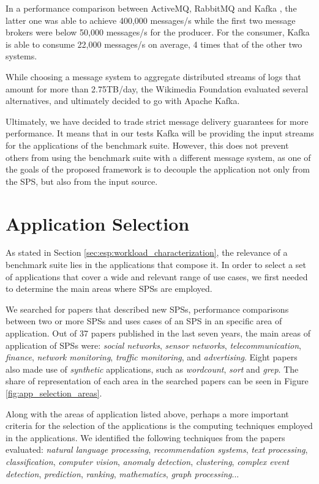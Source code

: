 \documentclass[ppgc,diss,english]{iiufrgs}
\begin{document}
In a performance comparison between ActiveMQ, RabbitMQ and Kafka \cite{kreps2011kafka}, the latter one was able to achieve 400,000 messages/s while the first two message brokers were below 50,000 messages/s for the producer. For the consumer, Kafka is able to consume 22,000 messages/s on average, 4 times that of the other two systems.

While choosing a message system to aggregate distributed streams of logs that amount for more than 2.75TB/day, the Wikimedia Foundation evaluated \cite{Wikimedia:2014} several alternatives, and ultimately decided to go with Apache Kafka.

Ultimately, we have decided to trade strict message delivery guarantees for more performance. It means that in our tests Kafka will be providing the input streams for the applications of the benchmark suite. However, this does not prevent others from using the benchmark suite with a different message system, as one of the goals of the proposed framework is to decouple the application not only from the SPS, but also from the input source.


\section{Application Selection}
\label{sec:application-selection}

As stated in Section \ref{sec:esp:workload_characterization}, the relevance of a benchmark suite lies in the applications that compose it. In order to select a set of applications that cover a wide and relevant range of use cases, we first needed to determine the main areas where SPSs are employed.

We searched for papers that described new SPSs, performance comparisons between two or more SPSs and uses cases of an SPS in an specific area of application. Out of 37 papers published in the last seven years, the main areas of application of SPSs were: \emph{social networks}, \emph{sensor networks}, \emph{telecommunication}, \emph{finance}, \emph{network monitoring}, \emph{traffic monitoring}, and \emph{advertising}. Eight papers also made use of \emph{synthetic} applications, such as \emph{wordcount}, \emph{sort} and \emph{grep}. The share of representation of each area in the searched papers can be seen in Figure \ref{fig:app_selection_areas}.

Along with the areas of application listed above, perhaps a more important criteria for the selection of the applications is the computing techniques employed in the applications. We identified the following techniques from the papers evaluated: \emph{natural language processing}, \emph{recommendation systems}, \emph{text processing}, \emph{classification}, \emph{computer vision}, \emph{anomaly detection}, \emph{clustering}, \emph{complex event detection}, \emph{prediction}, \emph{ranking}, \emph{mathematics}, \emph{graph processing}...
\end{document}
